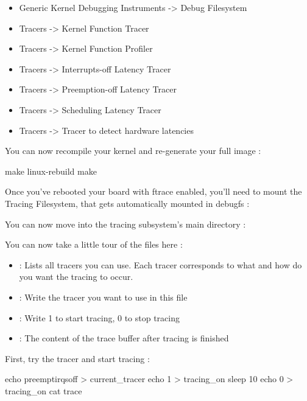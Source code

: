 \begin{itemize}
	\item Generic Kernel Debugging Instruments -> Debug Filesystem
	\item Tracers -> Kernel Function Tracer
	\item Tracers -> Kernel Function Profiler
	\item Tracers -> Interrupts-off Latency Tracer
	\item Tracers -> Preemption-off Latency Tracer
	\item Tracers -> Scheduling Latency Tracer
	\item Tracers -> Tracer to detect hardware latencies
\end{itemize}

You can now recompile your kernel and re-generate your full image :

\begin{bashinput}
make linux-rebuild
make
\end{bashinput}

Once you've rebooted your board with ftrace enabled, you'll need to mount the
Tracing Filesystem, that gets automatically mounted in debugfs :



You can now move into the tracing subsystem's main directory :


You can now take a little tour of the files here :

\begin{itemize}
	\item {} : Lists all tracers you can use. Each tracer
		corresponds to what and how do you want the tracing to occur.
	\item {} : Write the tracer you want to use in this file
	\item {} : Write 1 to start tracing, 0 to stop tracing
	\item {} : The content of the trace buffer after tracing is finished
\end{itemize}

First, try the  tracer and start tracing :

\begin{bashinput}
echo preemptirqsoff > current_tracer
echo 1 > tracing_on
sleep 10
echo 0 > tracing_on
cat trace
\end{bashinput}

